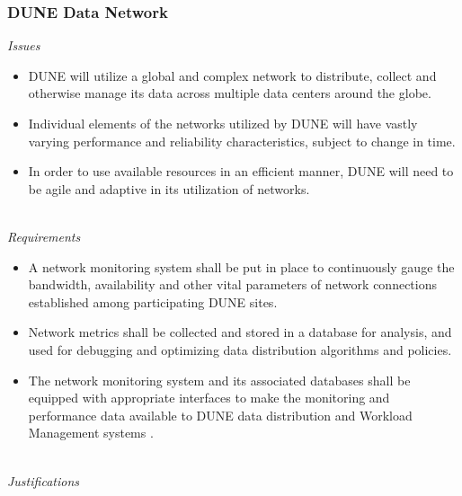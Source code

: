 \subsubsection{DUNE Data Network}
\textit{Issues}
\begin{itemize}
	\item DUNE will utilize a global and complex network to distribute, collect and otherwise manage its data across multiple data centers around the globe.
	
	\item Individual elements of the networks utilized by DUNE will have vastly varying performance and reliability characteristics, subject to change in time.
	
	\item In order to use available resources in an efficient manner, DUNE will need to be agile and adaptive in its utilization of networks.
\end{itemize}
\ 
\\
\textit{Requirements}
\begin{itemize}
	
	\item A network monitoring system shall be put in place to continuously gauge the bandwidth, 
	availability and other vital parameters of network connections established among participating DUNE sites.
	
	\item Network metrics shall be collected and stored in a database for analysis, and used for debugging and optimizing data distribution algorithms and policies.
	
	\item The network monitoring system and its associated databases  shall be equipped with appropriate interfaces to make the monitoring and performance data available to DUNE data distribution and Workload Management systems .
	
\end{itemize}
\ 
\\
\textit{Justifications}

